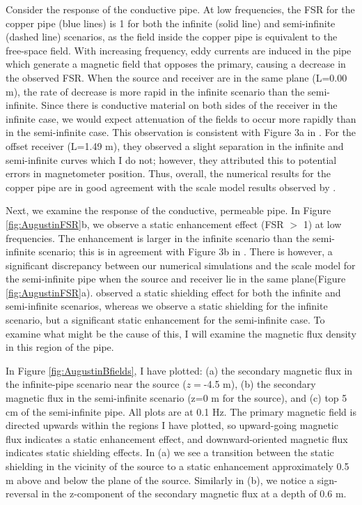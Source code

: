 Consider the response of the conductive pipe. At low frequencies, the FSR for the copper pipe (blue lines) is 1 for both the infinite (solid line) and semi-infinite (dashed line) scenarios, as the field inside the copper pipe is equivalent to the free-space field. With increasing frequency, eddy currents are induced in the pipe which generate a magnetic field that opposes the primary, causing a decrease in the observed FSR. When the source and receiver are in the same plane (L=0.00 m), the rate of decrease is more rapid in the infinite scenario than the semi-infinite. Since there is conductive material on both sides of the receiver in the infinite case, we would expect attenuation of the fields to occur more rapidly than in the semi-infinite case. This observation is consistent with Figure 3a in \cite{Augustin1989}. For the offset receiver (L=1.49 m), they observed a slight separation in the infinite and semi-infinite curves which I do not; however, they attributed this to potential errors in magnetometer position. Thus, overall, the numerical results for the copper pipe are in good agreement with the scale model results observed by \cite{Augustin1989}.

Next, we examine the response of the conductive, permeable pipe. In Figure \ref{fig:AugustinFSR}b, we observe a static enhancement effect (FSR $>$ 1) at low frequencies. The enhancement is larger in the infinite scenario than the semi-infinite scenario; this is in agreement with Figure 3b in \cite{Augustin1989}. There is however, a significant discrepancy between our numerical simulations and the scale model for the semi-infinite pipe when the source and receiver lie in the same plane(Figure \ref{fig:AugustinFSR}a). \cite{Augustin1989} observed a static shielding effect for both the infinite and semi-infinite scenarios, whereas we observe a static shielding for the infinite scenario, but a significant static enhancement for the semi-infinite case. To examine what might be the cause of this, I will examine the magnetic flux density in this region of the pipe.

In Figure \ref{fig:AugustinBfields}, I have plotted: (a) the secondary magnetic flux in the infinite-pipe scenario near the source ($z=$-4.5 m), (b) the secondary magnetic flux in the semi-infinite scenario (z=0 m for the source), and (c) top 5 cm of the semi-infinite pipe. All plots are at 0.1 Hz. The primary magnetic field is directed upwards within the regions I have plotted, so upward-going magnetic flux indicates a static enhancement effect, and downward-oriented magnetic flux indicates static shielding effects. In (a) we see a transition between the static shielding in the vicinity of the source to a static enhancement approximately 0.5 m above and below the plane of the source. Similarly in (b), we notice a sign-reversal in the z-component of the secondary magnetic flux at a depth of 0.6 m.

